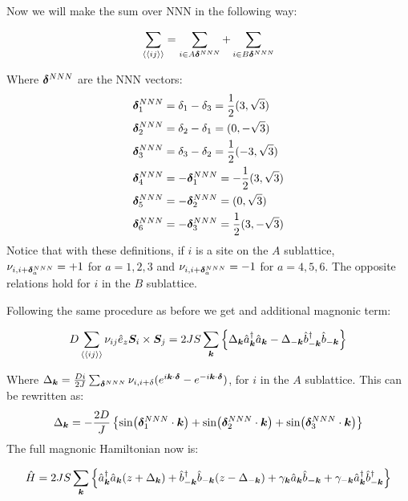 Now we will make the sum over NNN in the following way:

\begin{equation}
\sum_{\langle \langle i j \rangle \rangle} = \sum_{i\in A \boldsymbol{\delta}^{NNN}} +  \sum_{i\in B \boldsymbol{\delta}^{NNN}}
\end{equation}

Where $\boldsymbol{\delta}^{NNN}$ are the NNN vectors:
\begin{align*}
\boldsymbol{\delta}^{NNN}_1 &= \delta_1-\delta_3 = \frac{1}{2}(3, \sqrt{3}) \\
\boldsymbol{\delta}^{NNN}_2 &= \delta_2-\delta_1 = (0, -\sqrt{3}) \\
\boldsymbol{\delta}^{NNN}_3 &= \delta_3-\delta_2 = \frac{1}{2}(-3, \sqrt{3}) \\
\boldsymbol{\delta}^{NNN}_4 &= -\boldsymbol{\delta}^{NNN}_1 = -\frac{1}{2}(3, \sqrt{3}) \\
\boldsymbol{\delta}^{NNN}_5 &= -\boldsymbol{\delta}^{NNN}_2 = (0, \sqrt{3}) \\
\boldsymbol{\delta}^{NNN}_6 &= -\boldsymbol{\delta}^{NNN}_3 = \frac{1}{2}(3, -\sqrt{3}) \\
\end{align*}
Notice that with these definitions, if $i$ is a site on the $A$ sublattice, $\nu_{i,i+\boldsymbol{\delta}^{NNN}_a}=+1$ for $a=1,2,3$ and $\nu_{i,i+\boldsymbol{\delta}^{NNN}_a}=-1$ for $a=4,5,6$. The opposite relations hold for $i$ in the $B$ sublattice.

 Following the same procedure as before we get and additional magnonic term:

\begin{equation}
D \sum_{\langle \langle i j \rangle \rangle} \nu_{ij}\hat{e}_z \boldsymbol{S}_i \times \boldsymbol{S}_j = 2JS\sum_{\boldsymbol{k}} \left\{ \Delta_{\boldsymbol{k}}\hat{a}^\dagger_{\boldsymbol{k}}\hat{a}_{\boldsymbol{k}} - \Delta_{-\boldsymbol{k}}\hat{b}^\dagger_{-\boldsymbol{k}}\hat{b}_{-\boldsymbol{k}} \right\}
\end{equation}

Where $\Delta_{\boldsymbol{k}} = \frac{Di}{2J}\sum_{\boldsymbol{\delta}^{NNN}} \nu_{i,i+\delta} (e^{i\boldsymbol{k}\cdot\boldsymbol{\delta}} -e^{-i\boldsymbol{k}\cdot\boldsymbol{\delta}})$, for $i$ in the $A$ sublattice. This can be rewritten as:
\begin{equation}
\Delta_{\boldsymbol{k}} = -\frac{2D}{J}\left\{ \sin(\boldsymbol{\delta}^{NNN}_1 \cdot \boldsymbol{k}) + \sin(\boldsymbol{\delta}^{NNN}_2 \cdot \boldsymbol{k}) + \sin(\boldsymbol{\delta}^{NNN}_3 \cdot \boldsymbol{k})\right\}
\end{equation}
The full magnonic Hamiltonian now is:

\begin{equation}
\label{MagnonicH2}
\hat{H} = 2JS \sum_{\boldsymbol{k}} \left\{ \hat{a}^\dagger_{\boldsymbol{k}}\hat{a}_{\boldsymbol{k}}(z+\Delta_{\boldsymbol{k}}) + \hat{b}^\dagger_{-\boldsymbol{k}}\hat{b}_{-\boldsymbol{k}}(z-\Delta_{-\boldsymbol{k}}) + \gamma_{\boldsymbol{k}}\hat{a}_{\boldsymbol{k}}\hat{b}_{\boldsymbol{-k}} + \gamma_{-\boldsymbol{k}}\hat{a}^\dagger_{\boldsymbol{k}}\hat{b}^\dagger_{-\boldsymbol{k}} \right\}
\end{equation}

